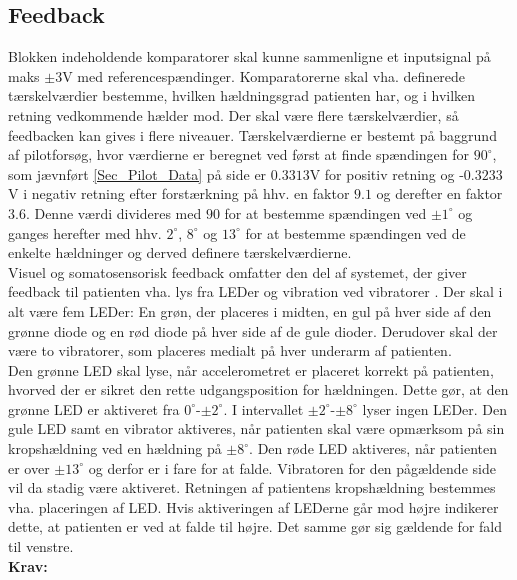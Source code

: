 \subsection{Feedback}\label{KomparatorAfs}
Blokken indeholdende komparatorer skal kunne sammenligne et inputsignal på maks $\pm3$V med referencespændinger. Komparatorerne skal vha. definerede tærskelværdier bestemme, hvilken hældningsgrad patienten har, og i hvilken retning vedkommende hælder mod. Der skal være flere tærskelværdier, så feedbacken kan gives i flere niveauer. Tærskelværdierne er bestemt på baggrund af pilotforsøg, hvor værdierne er beregnet ved først at finde spændingen for $90^{\circ}$, som jævnført \ref{Sec_Pilot_Data} på side \pageref{Sec_Pilot_Data} er $0.3313$V for positiv retning og -$0.3233$V i negativ retning efter forstærkning på hhv. en faktor $9.1$ og derefter en faktor $3.6$. Denne værdi divideres med $90$ for at bestemme spændingen ved $\pm1^{\circ}$ og ganges herefter med hhv. $2^{\circ}$,  $8^{\circ}$ og $13^{\circ}$ for at bestemme spændingen ved de enkelte hældninger og derved definere tærskelværdierne.\\
Visuel og somatosensorisk feedback omfatter den del af systemet, der giver feedback til patienten vha. lys fra LEDer og vibration ved vibratorer . Der skal i alt være fem LEDer: En grøn, der placeres i midten, en gul på hver side af den grønne diode og en rød diode på hver side af de gule dioder. Derudover skal der være to vibratorer, som placeres medialt på hver underarm af patienten.\\
Den grønne LED skal lyse, når accelerometret er placeret korrekt på patienten, hvorved der er sikret den rette udgangsposition for hældningen. Dette gør, at den grønne LED er aktiveret fra $0^{\circ}$-$\pm2^{\circ}$. I intervallet $\pm2^{\circ}$-$\pm8^{\circ}$ lyser ingen LEDer. Den gule LED samt en vibrator aktiveres, når patienten skal være opmærksom på sin kropshældning ved en hældning på $\pm8^{\circ}$. Den røde LED aktiveres, når patienten er over $\pm13^{\circ}$ og derfor er i fare for at falde. Vibratoren for den pågældende side vil da stadig være aktiveret. Retningen af patientens kropshældning bestemmes vha. placeringen af LED. Hvis aktiveringen af LEDerne går mod højre indikerer dette, at patienten er ved at falde til højre. Det samme gør sig gældende for fald til venstre. \\
\textbf{Krav:} 
